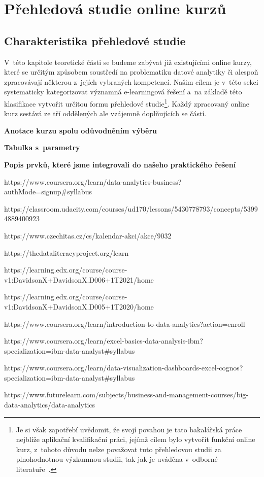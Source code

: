 \hypertarget{pux159ehledovuxe1-studie-online-kurzux16f}{%
\chapter{Přehledová studie online kurzů}\label{pux159ehledovuxe1-studie-online-kurzux16f}}

\hypertarget{charakteristika-pux159ehledovuxe9-studie}{%
\section{Charakteristika přehledové studie}\label{charakteristika-pux159ehledovuxe9-studie}}

V~této kapitole teoretické části se budeme zabývat již existujícími online kurzy, které se určitým způsobem soustředí na problematiku datové analytiky či alespoň zpracovávají některou z~jejích vybraných kompetencí. Našim cílem je v~této sekci systematicky kategorizovat významná e-learningová řešení a~na základě této klasifikace vytvořit určitou formu přehledové studie\footnote{Je si však zapotřebí uvědomit, že svojí povahou je tato bakalářská práce nejblíže aplikační kvalifikační práci, jejímž cílem bylo vytvořit funkční online kurz, z~tohoto důvodu nelze považovat tuto přehledovou studii za plnohodnotnou výzkumnou studii, tak jak je uváděna v~odborné literatuře~\parencite{mares2013}.}. Každý zpracovaný online kurz sestává ze tří oddělených ale vzájemně doplňujících se částí.

\textbf{Anotace kurzu spolu odůvodněním výběru}

\textbf{Tabulka s~parametry}

\textbf{Popis prvků, které jsme integrovali do našeho praktického řešení}

https://www.coursera.org/learn/data-analytics-business?authMode=signup\#syllabus

https://classroom.udacity.com/courses/ud170/lessons/5430778793/concepts/53994889400923

https://www.czechitas.cz/cs/kalendar-akci/akce/9032

https://thedataliteracyproject.org/learn

https://learning.edx.org/course/course-v1:DavidsonX+DavidsonX.D006+1T2021/home

https://learning.edx.org/course/course-v1:DavidsonX+DavidsonX.D005+1T2020/home

https://www.coursera.org/learn/introduction-to-data-analytics?action=enroll

https://www.coursera.org/learn/excel-basics-data-analysis-ibm?specialization=ibm-data-analyst\#syllabus

https://www.coursera.org/learn/data-visualization-dashboards-excel-cognos?specialization=ibm-data-analyst\#syllabus

https://www.futurelearn.com/subjects/business-and-management-courses/big-data-analytics/data-analytics
